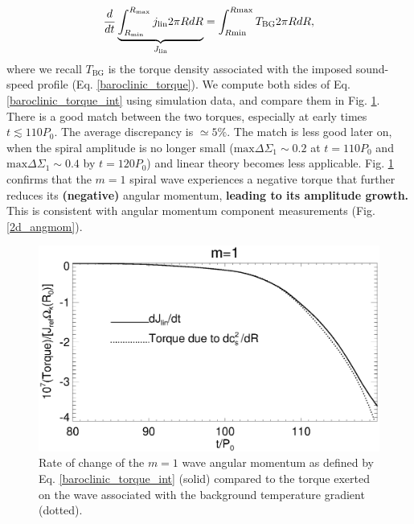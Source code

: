 \begin{align}\label{baroclinic_torque_int}
  \frac{d}{dt}\underbrace{\int_{R_\mathrm{min}}^{R_\mathrm{max}}j_\mathrm{lin}
    2\pi R dR}_{J_\mathrm{lin}} 
  =\int_{R\mathrm{min}}^{R\mathrm{max}}T_\mathrm{BG} 2\pi R dR, 
\end{align}
where we recall $T_\mathrm{BG}$ is the torque density associated with the imposed
sound-speed profile (Eq. \ref{baroclinic_torque}). We  
compute both sides of Eq. \ref{baroclinic_torque_int} using
simulation data, and compare them in Fig. \ref{fargo_angmom_ex}. There
is a good match between the two torques, especially at early times
$t\lesssim110P_0$. The average discrepancy is $\simeq 5\%$. 
The match is less good later on, when the spiral
amplitude is no longer small ($\mathrm{max}\Delta\Sigma_1\sim 0.2$ at $t=110P_0$
and $\mathrm{max}\Delta\Sigma_1\sim 0.4$ by $t=120P_0$) and linear theory becomes
less applicable. Fig. \ref{fargo_angmom_ex} confirms that the $m=1$ spiral
wave experiences a negative torque that further reduces its {\bf (negative)} angular
momentum, {\bf leading to its amplitude growth.} This is consistent
with angular momentum component measurements (Fig. \ref {2d_angmom}).  

\begin{figure}
  \includegraphics[width=\linewidth]{figures/m1_analysis_ang_fargo} 
  \caption{Rate of change of the $m=1$ wave angular momentum as defined by
    Eq. \ref{baroclinic_torque_int} (solid) compared to the torque
    exerted on the wave associated with the background temperature
    gradient (dotted). 
    \label{fargo_angmom_ex}} 
\end{figure}


